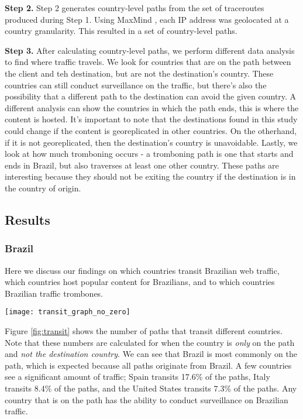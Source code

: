 {\bf Step 2.}  Step 2 generates country-level paths from the set of traceroutes produced during Step 1.  Using MaxMind , each IP address was geolocated at a country granularity.  This resulted in a set of country-level paths.  

{\bf Step 3.}  After calculating country-level paths, we perform different data analysis to find where traffic travels.  We look for countries that are on the path between the client and teh destination, but are not the destination's country.  These countries can still conduct surveillance on the traffic, but there's also the possibility that a different path to the destination can avoid the given country.  A different analysis can show the countries in which the path ends, this is where the content is hosted.  It's important to note that the destinations found in this study could change if the content is georeplicated in other countries.  On the otherhand, if it is not georeplicated, then the destination's country is unavoidable.  Lastly, we look at how much tromboning occurs - a tromboning path is one that starts and ends in Brazil, but also traverses at least one other country.  These paths are interesting because they should not be exiting the country if the destination is in the country of origin.  

\subsection{Results}

\subsubsection{Brazil}
Here we discuss our findings on which countries transit Brazilian web traffic, which countries host popular content for Brazilians, and to which countries Brazilian traffic trombones.  

\begin{figure*}
\centering
\texttt{[image: transit\_graph\_no\_zero]}
\caption{The number of paths that solely transit a country (do not end in the country).}
\label{fig:transit}
\end{figure*}

Figure \ref{fig:transit} shows the number of paths that transit different countries.  Note that these numbers are calculated for when the country is \textit{only} on the path and \textit{not the destination country}.  We can see that Brazil is most commonly on the path, which is expected because all paths originate from Brazil.  A few countries see a significant amount of traffic; Spain transits 17.6\% of the paths, Italy transits 8.4\% of the paths, and the United States transits 7.3\% of the paths.  Any country that is on the path has the ability to conduct surveillance on Brazilian traffic.  

